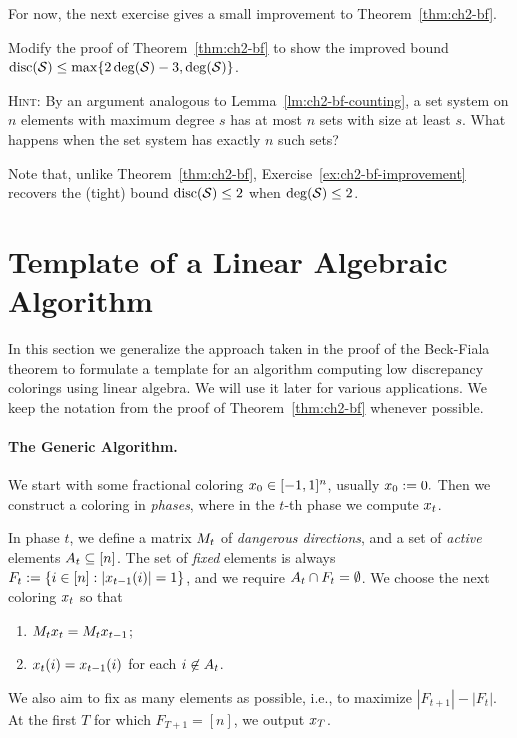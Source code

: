 For now, the next exercise gives a small improvement to
Theorem~\ref{thm:ch2-bf}.

\begin{exercise}\label{ex:ch2-bf-improvement}
  Modify the proof of Theorem~\ref{thm:ch2-bf} to show the improved
  bound $\operatorname{disc}(\mathcal{S}) \le \max\{2\operatorname{deg}(\mathcal{S}) - 3, \operatorname{deg}(\mathcal{S})\}$.

  \textsc{Hint:} By an argument analogous to
  Lemma~\ref{lm:ch2-bf-counting}, a set system on $n$ elements with maximum degree $s$
  has at most $n$ sets with size at least $s$. What happens when the
  set system has exactly $n$ such sets?
\end{exercise}

Note that, unlike Theorem~\ref{thm:ch2-bf},
Exercise~\ref{ex:ch2-bf-improvement} recovers the (tight) bound
$\operatorname{disc}(\mathcal{S}) \le 2$ when $\operatorname{deg}(\mathcal{S}) \le 2$. 

\section{Template of a Linear Algebraic Algorithm}

In this section we generalize the approach taken in the proof of the Beck-Fiala theorem to formulate a template for an algorithm computing low discrepancy colorings using linear algebra. We will use it later for various applications. We keep the notation from the proof of Theorem~\ref{thm:ch2-bf} whenever possible.

\paragraph{The Generic Algorithm.} We start with
some fractional coloring $x_0 \in [-1,1]^n$, usually
$x_0 := 0.$ Then we construct a coloring in \emph{phases}, where in the $t$-th phase we compute $x_t$. 

In phase $t$, we define a matrix $M_t$ of \emph{dangerous directions}, and a set of \emph{active} elements $A_t \subseteq [n]$. The set of \emph{fixed} elements is always $F_t := \{i \in [n]: |x_{t-1}(i)| = 1\}$, and we require $A_t \cap F_t = \emptyset$. We choose the next coloring $x_t$ so that
\begin{enumerate}
    \item $M_tx_t = M_t x_{t-1}$;
    \item $x_t(i) = x_{t-1}(i)$ for each
$i \not \in A_{t}$.
\end{enumerate}
We also aim to fix as many elements as possible, i.e., to maximize $|F_{t+1}| - |F_t|$. At the first $T$ for which $F_{T+1} = [n]$, we output $x_T$.

